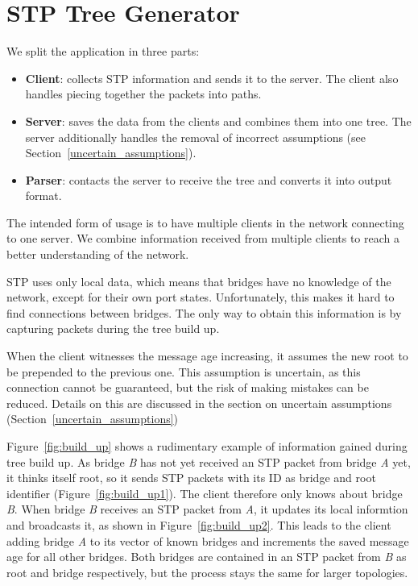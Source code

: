 \chapter{STP Tree Generator}
\label{stp-gen}
We split the application in three parts:
\begin{itemize}
    \item \textbf{Client}: collects STP information and sends it to the server.
        The client also handles piecing together the packets into paths.
    \item \textbf{Server}: saves the data from the clients and combines them into one tree.
        The server additionally handles the removal of incorrect assumptions (see Section~\ref{uncertain_assumptions}).
    \item \textbf{Parser}: contacts the server to receive the tree and converts it into output format.
\end{itemize}
The intended form of usage is to have multiple clients in the network connecting to one server.
We combine information received from multiple clients to reach a better understanding of the network.

STP uses only local data, which means that bridges have no knowledge of the network, except for their own port states.
Unfortunately, this makes it hard to find connections between bridges.
The only way to obtain this information is by capturing packets during the tree build up.

When the client witnesses the message age increasing, it assumes the new root to be prepended to the previous one.
This assumption is uncertain, as this connection cannot be guaranteed, but the risk of making mistakes can be reduced.
Details on this are discussed in the section on uncertain assumptions (Section~\ref{uncertain_assumptions})

Figure~\ref{fig:build_up} shows a rudimentary example of information gained during tree build up.
As bridge \textit{B} has not yet received an STP packet from bridge \textit{A} yet, it thinks itself root, so it sends STP packets with its ID as bridge and root identifier (Figure~\ref{fig:build_up1}).
The client therefore only knows about bridge \textit{B}.
When bridge \textit{B} receives an STP packet from \textit{A}, it updates its local informtion and broadcasts it, as shown in Figure~\ref{fig:build_up2}.
This leads to the client adding bridge \textit{A} to its vector of known bridges and increments the saved message age for all other bridges.
Both bridges are contained in an STP packet from \textit{B} as root and bridge respectively, but the process stays the same for larger topologies.

